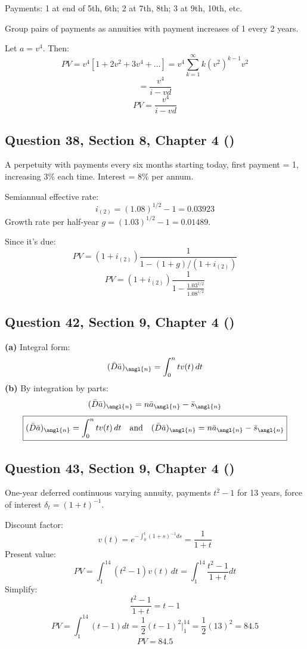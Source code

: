 \documentclass[12pt, a4paper]{article}
\begin{document}
Payments: 1 at end of 5th, 6th; 2 at 7th, 8th; 3 at 9th, 10th, etc.

Group pairs of payments as annuities with payment increases of 1 every 2 years.

Let \(a = v^4\). Then:
\[
PV = v^4 [1 + 2v^2 + 3v^4 + \dots] = v^4 \sum_{k=1}^{\infty} k (v^2)^{k-1} v^2
\]
\[
= \frac{v^4}{i - v d}
\]
\[
\boxed{PV = \frac{v^4}{i - v d}}
\]

\subsection*{Question 38, Section 8, Chapter 4  (\cite{toi3rd})}

A perpetuity with payments every six months starting today, first payment = 1, increasing 3\% each time.  
Interest = 8\% per annum.

Semiannual effective rate:
\[
i_{(2)} = (1.08)^{1/2} - 1 = 0.03923
\]
Growth rate per half-year \( g = (1.03)^{1/2} - 1 = 0.01489 \).

Since it’s due:
\[
PV = (1 + i_{(2)}) \frac{1}{1 - (1 + g)/(1 + i_{(2)})}
\]
\[
\boxed{PV = (1 + i_{(2)}) \frac{1}{1 - \frac{1.03^{1/2}}{1.08^{1/2}}}}
\]

\subsection*{Question 42, Section 9, Chapter 4  (\cite{toi3rd})}

\textbf{(a)}  
Integral form:
\[
(\bar{D}\bar{a})_{\angl{n}} = \int_0^n t v(t) \, dt
\]
\textbf{(b)}  
By integration by parts:
\[
(\bar{D}\bar{a})_{\angl{n}} = n \bar{a}_{\angl{n}} - \bar{s}_{\angl{n}}
\]
\[
\boxed{
(\bar{D}\bar{a})_{\angl{n}} = \int_0^n t v(t) \, dt 
\quad \text{and} \quad
(\bar{D}\bar{a})_{\angl{n}} = n\bar{a}_{\angl{n}} - \bar{s}_{\angl{n}}
}
\]

\subsection*{Question 43, Section 9, Chapter 4  (\cite{toi3rd})}

One-year deferred continuous varying annuity, payments \( t^2 - 1 \) for 13 years,  
force of interest \( \delta_t = (1 + t)^{-1} \).

Discount factor:
\[
v(t) = e^{-\int_0^t (1 + s)^{-1} ds} = \frac{1}{1 + t}
\]
Present value:
\[
PV = \int_1^{14} (t^2 - 1)v(t)\,dt = \int_1^{14} \frac{t^2 - 1}{1 + t} dt
\]
Simplify:
\[
\frac{t^2 - 1}{1 + t} = t - 1
\]
\[
PV = \int_1^{14} (t - 1)dt = \frac{1}{2}(t - 1)^2 \bigg|_1^{14} = \frac{1}{2}(13)^2 = 84.5
\]
\[
\boxed{PV = 84.5}
\]
\end{document}
